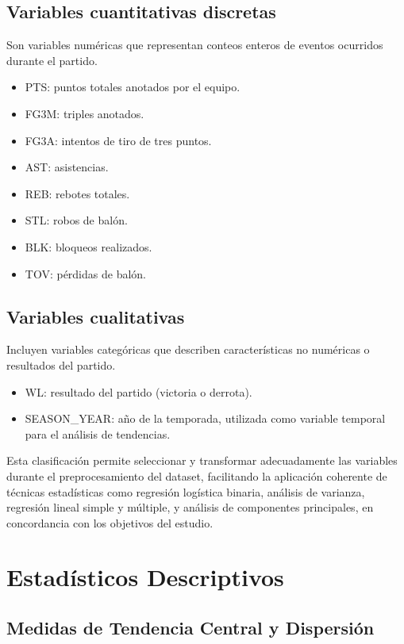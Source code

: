 \documentclass[12pt]{article}
\begin{document}
\subsection*{Variables cuantitativas discretas}
Son variables numéricas que representan conteos enteros de eventos ocurridos durante el partido.

\begin{itemize}
    \item PTS: puntos totales anotados por el equipo.
    \item FG3M: triples anotados.
    \item FG3A: intentos de tiro de tres puntos.
    \item AST: asistencias.
    \item REB: rebotes totales.
    \item STL: robos de balón.
    \item BLK: bloqueos realizados.
    \item TOV: pérdidas de balón.
\end{itemize}

\subsection*{Variables cualitativas}
Incluyen variables categóricas que describen características no numéricas o resultados del partido.

\begin{itemize}
    \item WL: resultado del partido (victoria o derrota).
    \item SEASON\_YEAR: año de la temporada, utilizada como variable temporal para el análisis de tendencias.
\end{itemize}

Esta clasificación permite seleccionar y transformar adecuadamente las variables durante el preprocesamiento del dataset, facilitando la aplicación coherente de técnicas estadísticas como regresión logística binaria, análisis de varianza, regresión lineal simple y múltiple, y análisis de componentes principales, en concordancia con los objetivos del estudio.

\section{Estadísticos Descriptivos}
\label{sec:estadisticos-descriptivos}

\subsection{Medidas de Tendencia Central y Dispersión}
\label{subsec:medidas-tendencia}
\end{document}
